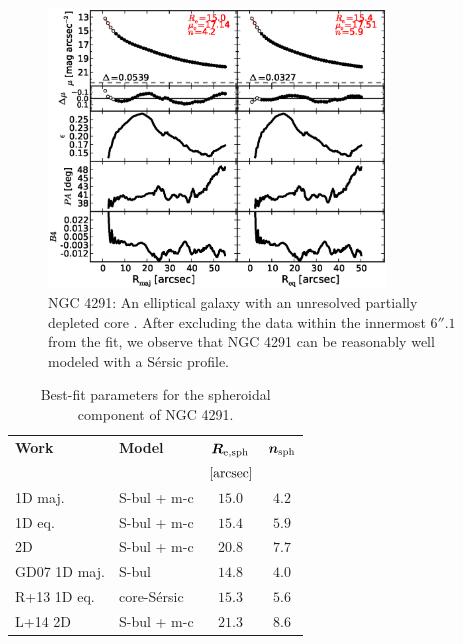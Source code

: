 \documentclass[preprint2]{emulateapj}
\newcommand{\fitfigurewidth}{0.8\textwidth}
\begin{document}
  \begin{figure}[h]
  \begin{center}
  \includegraphics[width=\fitfigurewidth]{images/n4291_1Dfit.eps}
  \caption{NGC 4291: 
  An elliptical galaxy with an unresolved partially depleted core \citep{rusli2013}. %
  After excluding the data within the innermost $6''.1$ from the fit, 
  we observe that NGC 4291 can be reasonably well modeled with a S\'ersic profile.
  }
  \end{center}
  \end{figure}

  \begin{table}[h]
  \small
  \caption{Best-fit parameters for the spheroidal component of NGC 4291.}
  \begin{center}
  \begin{tabular}{llcc}
  \hline
  {\bf Work} & {\bf Model}   & $\bm R_{\rm e,sph}$    & $\bm n_{\rm sph}$ \\
    &  &  $[\rm arcsec]$ & \\
  \hline
  1D maj. & S-bul + m-c & $15.0$  &  $4.2$ \\
  1D eq.  & S-bul + m-c & $15.4$  &  $5.9$ \\
  2D      & S-bul + m-c & $20.8$  &  $7.7$ \\
  \hline
  GD07 1D maj.         & S-bul         & $14.8$  &  $4.0$ \\
  R+13 1D eq.         & core-S\'ersic & $15.3$  &  $5.6$ \\
  L+14 2D         & S-bul + m-c   & $21.3$  &  $8.6$ \\
  \hline
  \end{tabular}
  \end{center}
  \label{tab:n4291}
  \end{table}
\end{document}
